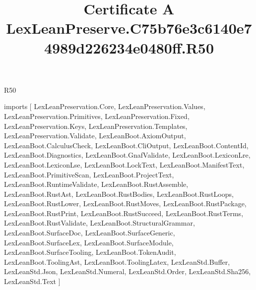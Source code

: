 \begin{lexlean}{R50}
\title{Certificate A LexLeanPreserve.C75b76e3c6140e74989d226234e0480ff.R50}
\begin{coremodule}
imports [
  LexLeanPreservation.Core,
  LexLeanPreservation.Values,
  LexLeanPreservation.Primitives,
  LexLeanPreservation.Fixed,
  LexLeanPreservation.Keys,
  LexLeanPreservation.Templates,
  LexLeanPreservation.Validate,
  LexLeanBoot.AxiomOutput,
  LexLeanBoot.CalculusCheck,
  LexLeanBoot.CliOutput,
  LexLeanBoot.ContentId,
  LexLeanBoot.Diagnostics,
  LexLeanBoot.GnafValidate,
  LexLeanBoot.LexiconLre,
  LexLeanBoot.LexiconLse,
  LexLeanBoot.LockText,
  LexLeanBoot.ManifestText,
  LexLeanBoot.PrimitiveScan,
  LexLeanBoot.ProjectText,
  LexLeanBoot.RuntimeValidate,
  LexLeanBoot.RustAssemble,
  LexLeanBoot.RustAst,
  LexLeanBoot.RustBodies,
  LexLeanBoot.RustLoops,
  LexLeanBoot.RustLower,
  LexLeanBoot.RustMoves,
  LexLeanBoot.RustPackage,
  LexLeanBoot.RustPrint,
  LexLeanBoot.RustSucceed,
  LexLeanBoot.RustTerms,
  LexLeanBoot.RustValidate,
  LexLeanBoot.StructuralGrammar,
  LexLeanBoot.SurfaceDoc,
  LexLeanBoot.SurfaceGeneric,
  LexLeanBoot.SurfaceLex,
  LexLeanBoot.SurfaceModule,
  LexLeanBoot.SurfaceTooling,
  LexLeanBoot.TokenAudit,
  LexLeanBoot.ToolingAst,
  LexLeanBoot.ToolingLatex,
  LexLeanStd.Buffer,
  LexLeanStd.Json,
  LexLeanStd.Numeral,
  LexLeanStd.Order,
  LexLeanStd.Sha256,
  LexLeanStd.Text
]


\end{coremodule}
\end{lexlean}
